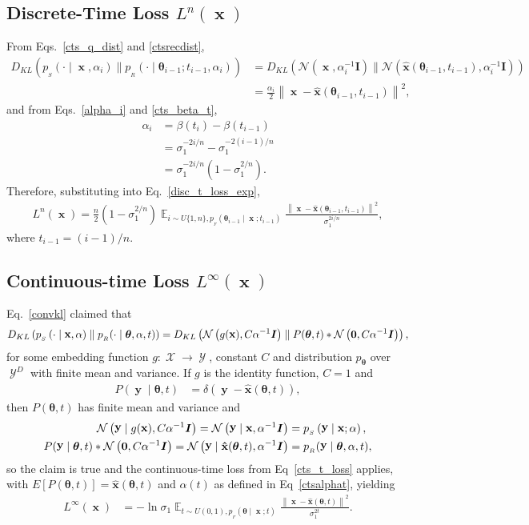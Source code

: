 \documentclass[11pt,table]{article}
\DeclareMathOperator*{\E}{\mathbb{E}}
\DeclareMathOperator{\x}{\mathbf{x}}
\DeclareMathOperator{\X}{\mathcal{X}}
\DeclareMathOperator{\y}{\mathbf{y}}
\DeclareMathOperator{\Y}{\mathcal{Y}}
\newcommand{\kl}[2]{D_{KL}\left(#1 \parallel #2\right)}
\newcommand{\N}[2]{\mathcal{N}\left(#1 , #2\right)}
\newcommand{\I}[1]{\boldsymbol{I}}
\newcommand{\tidx}[2]{#1_{#2}}
\renewcommand{\vec}[1]{\boldsymbol{#1}}
\newcommand{\pars}{\theta}
\newcommand{\parsn}{\vec{\pars}}
\newcommand{\parsnt}[1]{\tidx{\parsn}{#1}}
\newcommand{\alphat}[1]{\tidx{\alpha}{#1}}
\newcommand{\0}[1]{\constvec{0}{#1}}
\newcommand{\1}[1]{\constvec{1}{#1}}
\newcommand{\ds}[1]{\{1,#1\}}
\newcommand{\ui}[1]{U\ds{#1}}
\newcommand{\sender}[2]{p_{_S}\left(#1 \mid #2\right)}
\newcommand{\rec}{p_{_R}}
\newcommand{\flow}{p_{_F}}
\newcommand{\pred}[1]{\hat{#1}}
\begin{document}
\subsection{Discrete-Time Loss \texorpdfstring{$L^{n}(\x)$}{}}\label{sec:cts_disc_t_loss}
From Eqs.~\ref{cts_q_dist} and \ref{ctsrecdist},
\begin{align}
\kl{\sender{\cdot}{\x, \alphat{i}}}{\rec(\cdot \mid \parsnt{i-1}; t_{i-1}, \alphat{i})} &= \kl{\N{\x}{\alphat{i}^{-1}\I{D}}}{\N{\mathbf{\pred{x}}(\parsnt{i-1}, t_{i-1})}{\alphat{i}^{-1}\I{D}}}\\
&= \frac{\alphat{i}}{2}\left\|\x -\mathbf{\pred{x}}(\parsnt{i-1}, t_{i-1})\right\|^2,\label{ctskl}
\end{align}
and from Eqs.~\ref{alpha_i} and \ref{cts_beta_t},
\begin{align}
\alpha_i &= \beta(t_i) - \beta(t_{i-1})\\
&= \sigma_1^{-2i/n} - \sigma_1^{-2(i-1)/n}\\
&= \sigma_1^{-2 i / n} \left(1-\sigma_1^{2/n}\right).
\end{align}
Therefore, substituting into Eq.~\ref{disc_t_loss_exp},
\begin{align}
L^{n}(\x) = \frac{n}{2}\left(1-\sigma_1^{2/n}\right)\E_{i \sim \ui{n},\flow(\parsnt{i-1} \mid \x ; t_{i-1})}  \frac{\left\|\x -\mathbf{\pred{x}}(\parsnt{i-1}, t_{i-1})\right\|^2}{\sigma_1^{2i/n}},\label{n_step_loss_cts}
\end{align}
where $t_{i-1} = (i-1)/{n}$.
\subsection{Continuous-time Loss \texorpdfstring{$L^{\infty}(\x)$}{}}\label{sec:ctsctstloss}
Eq.~\ref{convkl} claimed that
\begin{align}
\kl{\sender{\cdot}{\x, \alpha}}{\rec(\cdot \mid \parsn, \alpha, t)} = \kl{\N{g(\x)}{C\alpha^{-1}\I{D}}}{P(\parsn, t) \ast \N{\0{D}}{C\alpha^{-1}\I{D}}},
\end{align}
for some embedding function $g: \X \rightarrow \Y$, constant $C$ and distribution $p_{\parsn}$ over $\Y^D$ with finite mean and variance.
If $g$ is the identity function, $C=1$ and 
\begin{align}
P(\y \mid \parsn, t) &= \delta(\y - \mathbf{\pred{x}}(\parsn, t)),\label{pgycts}
\end{align}
then $P(\parsn, t)$ has finite mean and variance and
\begin{align}
\N{\y \mid g(\x)}{C\alpha^{-1}\I{D}} = \N{\y \mid \x}{\alpha^{-1}\I{D}} &= \sender{\y}{\x; \alpha},\\
P(\y \mid \parsn, t) \ast \N{\0{D}}{C\alpha^{-1}\I{D}} = \N{ \y \mid \mathbf{\pred{x}}(\parsn, t)}{\alpha^{-1}\I{D}} &= \rec(\y \mid \parsn, \alpha, t),
\end{align}
so the claim is true and the continuous-time loss from Eq~\ref{cts_t_loss} applies, with $E[P(\parsn, t)] = \mathbf{\pred{x}}(\parsn, t)$
and $\alpha(t)$ as defined in Eq~\ref{ctsalphat}, yielding
\begin{align}
L^{\infty}(\x) &= -\ln \sigma_1\E_{t \sim U(0,1), \flow(\parsn \mid \x; t)}  \frac{\left\|\x - \mathbf{\pred{x}}(\parsn, t)\right\|^2}{\sigma_1^{2t}}.
\end{align}
\end{document}
